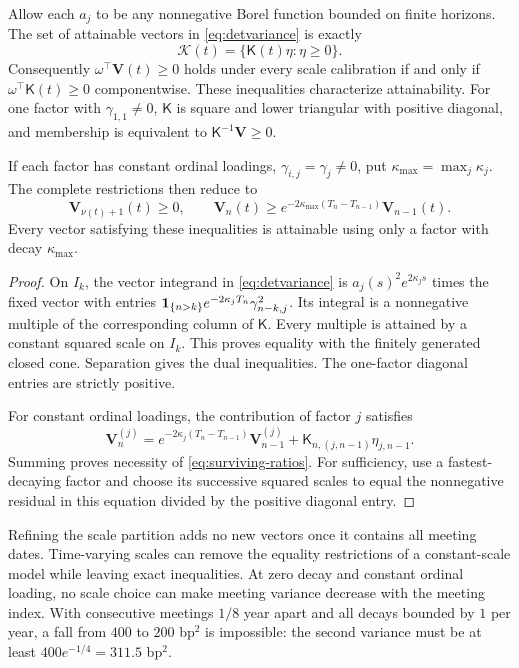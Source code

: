 \begin{theorem}\label{thm:scales}
Allow each $a_j$ to be any nonnegative Borel function bounded on finite horizons. The set of attainable vectors in \eqref{eq:detvariance} is exactly
\begin{equation}\label{eq:cone}
\mathcal K(t)=\{\mathsf K(t)\eta:\eta\geq0\}.
\end{equation}
Consequently $\omega^\top\boldsymbol V(t)\geq0$ holds under every scale calibration if and only if $\omega^\top\mathsf K(t)\geq0$ componentwise. These inequalities characterize attainability. For one factor with $\gamma_{1,1}\ne0$, $\mathsf K$ is square and lower triangular with positive diagonal, and membership is equivalent to $\mathsf K^{-1}\boldsymbol V\geq0$.

If each factor has constant ordinal loadings, $\gamma_{i,j}=\gamma_j\ne0$, put $\kappa_{\max}=\max_j\kappa_j$. The complete restrictions then reduce to
\begin{equation}\label{eq:surviving-ratios}
\boldsymbol V_{\nu(t)+1}(t)\geq0,\qquad
\boldsymbol V_n(t)\geq e^{-2\kappa_{\max}(T_n-T_{n-1})}
                         \boldsymbol V_{n-1}(t).
\end{equation}
Every vector satisfying these inequalities is attainable using only a factor with decay $\kappa_{\max}$.
\end{theorem}
\begin{proof}
On $I_k$, the vector integrand in \eqref{eq:detvariance} is $a_j(s)^2e^{2\kappa_js}$ times the fixed vector with entries $\mathbf 1_{\{n>k\}}e^{-2\kappa_jT_n}\gamma_{n-k,j}^2$. Its integral is a nonnegative multiple of the corresponding column of $\mathsf K$. Every multiple is attained by a constant squared scale on $I_k$. This proves equality with the finitely generated closed cone. Separation gives the dual inequalities. The one-factor diagonal entries are strictly positive.

For constant ordinal loadings, the contribution of factor $j$ satisfies
\[
\boldsymbol V_n^{(j)}=e^{-2\kappa_j(T_n-T_{n-1})}\boldsymbol V_{n-1}^{(j)}
                         +\mathsf K_{n,(j,n-1)}\eta_{j,n-1}.
\]
Summing proves necessity of \eqref{eq:surviving-ratios}. For sufficiency, use a fastest-decaying factor and choose its successive squared scales to equal the nonnegative residual in this equation divided by the positive diagonal entry.
\end{proof}

Refining the scale partition adds no new vectors once it contains all meeting dates. Time-varying scales can remove the equality restrictions of a constant-scale model while leaving exact inequalities. At zero decay and constant ordinal loading, no scale choice can make meeting variance decrease with the meeting index. With consecutive meetings $1/8$ year apart and all decays bounded by $1$ per year, a fall from $400$ to $200$ bp$^2$ is impossible: the second variance must be at least $400e^{-1/4}=311.5$ bp$^2$.


